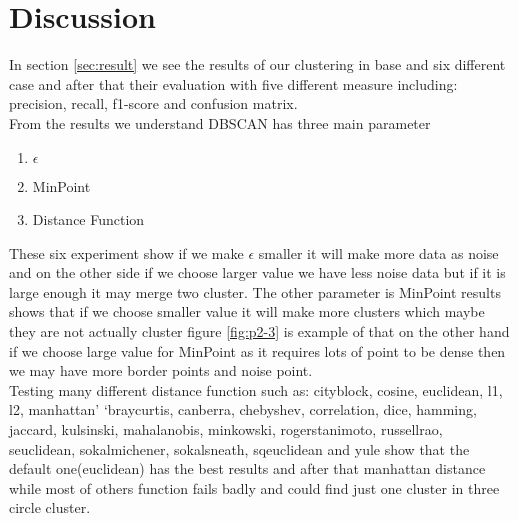 \section{Discussion}
In section \ref{sec:result} we see the results of our clustering in base and six different case and after that their evaluation with five different measure including: precision, recall, f1-score and confusion matrix.
\\
From the results we understand DBSCAN has three main parameter
\begin{enumerate}
	\item $ \epsilon $
	\item MinPoint
	\item Distance Function
\end{enumerate}
These six experiment show if we make $\epsilon$ smaller it will make more data as noise and on the other side if we choose larger value we have less noise data but if it is large enough it may merge two cluster.
\newline
The other parameter is MinPoint results shows that if we choose smaller value it will make more clusters which maybe they are not actually cluster figure \ref{fig:p2-3} is example of that on the other hand if we choose large value for MinPoint as it requires lots of point to be dense then we may have more border points and noise point.
\\
Testing many different distance function such as: cityblock, cosine, euclidean, l1, l2, manhattan’ ‘braycurtis, canberra, chebyshev, correlation, dice, hamming, jaccard, kulsinski, mahalanobis, minkowski, rogerstanimoto, russellrao, seuclidean, sokalmichener, sokalsneath, sqeuclidean and yule show that the default one(euclidean) has the best results and after that manhattan distance while most of others function fails badly and could find just one cluster in three circle cluster.